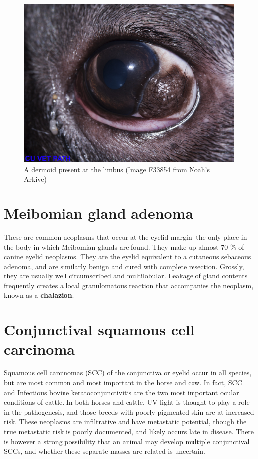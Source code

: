 \documentclass[openany]{book}
\begin{document}
\begin{figure}

{\centering \includegraphics{images/dermoid_F33854} 

}

\caption{A dermoid present at the limbus (Image F33854 from Noah's Arkive)}\label{fig:dermoid}
\end{figure}

\section{Meibomian gland adenoma}\label{meibomian-gland-adenoma}

These are common neoplasms that occur at the eyelid margin, the only
place in the body in which Meibomian glands are found. They make up
almost 70 \% of canine eyelid neoplasms. They are the eyelid equivalent
to a cutaneous sebaceous adenoma, and are similarly benign and cured
with complete resection. Grossly, they are usually well circumscribed
and multilobular. Leakage of gland contents frequently creates a local
granulomatous reaction that accompanies the neoplasm, known as a
\textbf{chalazion}.

\hypertarget{conjunctival-squamous-cell-carcinoma}{\section{Conjunctival
squamous cell carcinoma}\label{conjunctival-squamous-cell-carcinoma}}

Squamous cell carcinomas (SCC) of the conjunctiva or eyelid occur in all
species, but are most common and most important in the horse and cow. In
fact, SCC and
\protect\hyperlink{infectious-bovine-keratoconjunctivitis}{Infectious
bovine keratoconjunctivitis} are the two most important ocular
conditions of cattle. In both horses and cattle, UV light is thought to
play a role in the pathogenesis, and those breeds with poorly pigmented
skin are at increased risk. These neoplasms are infiltrative and have
metastatic potential, though the true metastatic risk is poorly
documented, and likely occurs late in disease. There is however a strong
possibility that an animal may develop multiple conjunctival SCCs, and
whether these separate masses are related is uncertain.
\end{document}
